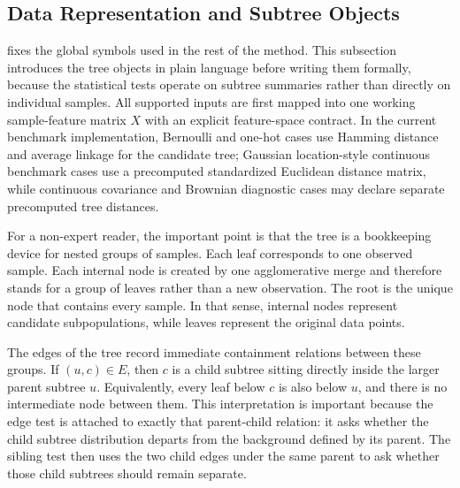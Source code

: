 
\subsection{Data Representation and Subtree Objects}

 fixes the global symbols used in the rest of the
method. This subsection introduces the tree objects in plain language before
writing them formally, because the statistical tests operate on subtree
summaries rather than directly on individual samples. All supported inputs are
first mapped into one working sample-feature matrix $X$ with an explicit
feature-space contract. In the current benchmark implementation, Bernoulli and
one-hot cases use Hamming distance and average linkage for the candidate tree;
Gaussian location-style continuous benchmark cases use a precomputed
standardized Euclidean distance matrix, while continuous covariance and
Brownian diagnostic cases may declare separate precomputed tree distances.

For a non-expert reader, the important point is that the tree is a
bookkeeping device for nested groups of samples. Each leaf corresponds to one
observed sample. Each internal node is created by one agglomerative merge and
therefore stands for a group of leaves rather than a new observation. The root
is the unique node that contains every sample. In that sense, internal nodes
represent candidate subpopulations, while leaves represent the original data
points.

The edges of the tree record immediate containment relations between these
groups. If $(u,c) \in E$, then $c$ is a child subtree sitting directly inside
the larger parent subtree $u$. Equivalently, every leaf below $c$ is also
below $u$, and there is no intermediate node between them. This interpretation
is important because the edge test is attached to exactly that parent-child
relation: it asks whether the child subtree distribution departs from the
background defined by its parent. The sibling test then uses the two child
edges under the same parent to ask whether those child subtrees should remain
separate.

